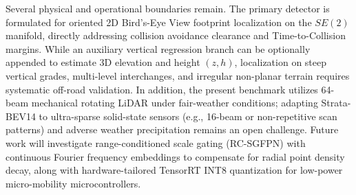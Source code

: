 Several physical and operational boundaries remain. The primary detector is formulated for oriented 2D Bird's-Eye View footprint localization on the $SE(2)$ manifold, directly addressing collision avoidance clearance and Time-to-Collision margins. While an auxiliary vertical regression branch can be optionally appended to estimate 3D elevation and height $(z, h)$, localization on steep vertical grades, multi-level interchanges, and irregular non-planar terrain requires systematic off-road validation. In addition, the present benchmark utilizes 64-beam mechanical rotating LiDAR under fair-weather conditions; adapting Strata-BEV14 to ultra-sparse solid-state sensors (e.g., 16-beam or non-repetitive scan patterns) and adverse weather precipitation remains an open challenge. Future work will investigate range-conditioned scale gating (RC-SGFPN) with continuous Fourier frequency embeddings to compensate for radial point density decay, along with hardware-tailored TensorRT INT8 quantization for low-power micro-mobility microcontrollers.
